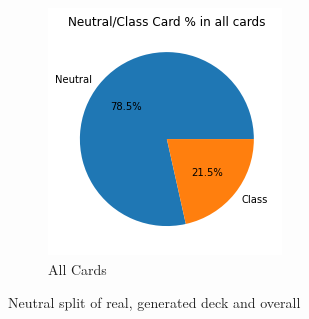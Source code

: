 \documentclass{report} %
\begin{document}
\begin{figure}[H]
\begin{subfigure}{.3\textwidth}
  \centering
  \includegraphics[width=.75\linewidth]{TestImages/NeutralSplitAllCards}
  \caption{All Cards}
\end{subfigure}
\caption{Neutral split of real, generated deck and overall}
\end{figure}
\end{document}
